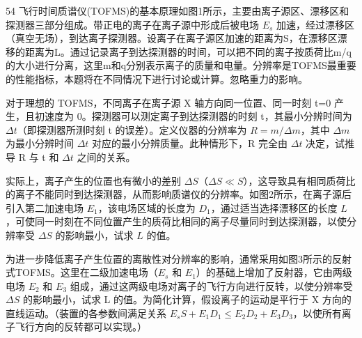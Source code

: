 \begin{problem}[第32届全国中学生物理竞赛决赛]{54}
飞行时间质谱仪(TOFMS)的基本原理如图1所示，主要由离子源区、漂移区和探测器三部分组成。带正电的离子在离子源中形成后被电场 $E_{s}$ 加速，经过漂移区（真空无场），到达离子探测器。设离子在离子源区加速的距离为S，在漂移区漂移的距离为L。通过记录离子到达探测器的时间，可以把不同的离子按质荷比m/q的大小进行分离，这里m和q分别表示离子的质量和电量。分辨率是TOFMS最重要的性能指标，本题将在不同情况下进行讨论或计算。忽略重力的影响。
\begin{subproblem}
对于理想的 TOFMS，不同离子在离子源 X 轴方向同一位置、同一时刻 t=0 产生，且初速度为 0。探测器可以测定离子到达探测器的时刻 t，其最小分辨时间为 $\Delta t$（即探测器所测时刻 t 的误差）。定义仪器的分辨率为 $R=m/\Delta m$，其中 $\Delta m$ 为最小分辨时间 $\Delta t$ 对应的最小分辨质量。此种情形下，R 完全由 $\Delta t$ 决定，试推导 R 与 t 和 $\Delta t$ 之间的关系。
\end{subproblem}
\begin{subproblem}
实际上，离子产生的位置也有微小的差别 $\Delta S$（$\Delta S \ll S$），这导致具有相同质荷比的离子不能同时到达探测器，从而影响质谱仪的分辨率。如图2所示，在离子源后引入第二加速电场 $E_{1}$，该电场区域的长度为 $D_{1}$，通过适当选择漂移区的长度 $L$，可使同一时刻在不同位置产生的质荷比相同的离子尽量同时到达探测器，以使分辨率受 $\Delta S$ 的影响最小，试求 $L$ 的值。
\end{subproblem}
\begin{subproblem}
为进一步降低离子产生位置的离散性对分辨率的影响，通常采用如图3所示的反射式TOFMS。这里在二级加速电场（$E_{s}$ 和 $E_{1}$）的基础上增加了反射器，它由两级电场 $E_{2}$ 和 $E_{3}$ 组成，通过这两级电场对离子的飞行方向进行反转，以使分辨率受 $\Delta S$ 的影响最小，试求 L 的值。为简化计算，假设离子的运动是平行于 X 方向的直线运动。（装置的各参数间满足关系 $E_{s}S + E_{1}D_{1} \leq E_{2}D_{2} + E_{3}D_{3}$，以使所有离子飞行方向的反转都可以实现。）
\end{subproblem}
\end{problem}